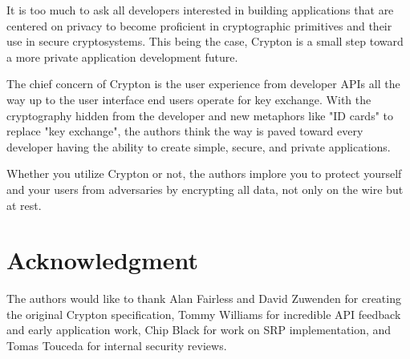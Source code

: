 \documentclass[conference]{IEEEtran}
\begin{document}
It is too much to ask all developers interested in building applications that are
centered on privacy to become proficient in cryptographic primitives and their
use in secure cryptosystems. This being the case, Crypton is a small step
toward a more private application development future.

The chief concern of Crypton is the user experience from developer APIs
all the way up to the user interface end users operate for key exchange. With the
cryptography hidden from the developer and new metaphors like "ID cards" to replace
"key exchange", the authors think the way is paved toward every developer having
the ability to create simple, secure, and private applications.

Whether you utilize Crypton or not, the authors implore you to protect yourself
and your users from adversaries by encrypting all data, not only on the wire but
at rest.

\section*{Acknowledgment}
The authors would like to thank Alan Fairless and David Zuwenden for creating the
original Crypton specification, Tommy Williams for incredible API feedback and
early application work, Chip Black for work on SRP implementation, and Tomas
Touceda for internal security reviews.
\end{document}
